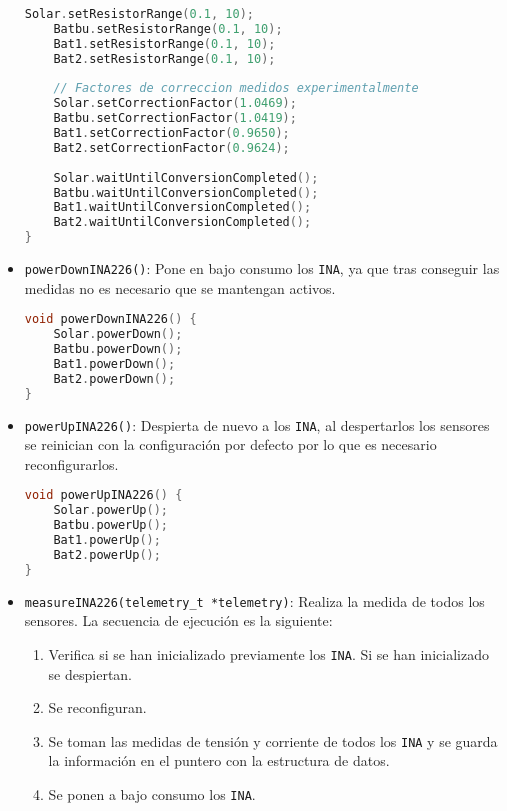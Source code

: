 \begin{itemize}
\begin{lstlisting}[captionpos=b, caption={Codigo funcion reconfig\_INAs}, language=c++]
    Solar.setResistorRange(0.1, 10);
    Batbu.setResistorRange(0.1, 10);
    Bat1.setResistorRange(0.1, 10);
    Bat2.setResistorRange(0.1, 10);
    
    // Factores de correccion medidos experimentalmente
    Solar.setCorrectionFactor(1.0469);
    Batbu.setCorrectionFactor(1.0419);
    Bat1.setCorrectionFactor(0.9650);
    Bat2.setCorrectionFactor(0.9624);
    
    Solar.waitUntilConversionCompleted();
    Batbu.waitUntilConversionCompleted();
    Bat1.waitUntilConversionCompleted();
    Bat2.waitUntilConversionCompleted();
}
\end{lstlisting}

\item \texttt{powerDownINA226()}: Pone en bajo consumo los \texttt{INA}, ya que tras conseguir las medidas no es necesario que se mantengan activos.

\begin{lstlisting}[captionpos=b, caption={Codigo funcion powerDownINA226}, language=c++]
void powerDownINA226() {
    Solar.powerDown();
    Batbu.powerDown();
    Bat1.powerDown();
    Bat2.powerDown();
}
\end{lstlisting}


\item \texttt{powerUpINA226()}: Despierta de nuevo a los \texttt{INA}, al despertarlos los sensores se reinician con la configuración por defecto por lo que es necesario reconfigurarlos.

\begin{lstlisting}[captionpos=b, caption={Codigo funcion powerUpINA226}, language=c++]
void powerUpINA226() {
    Solar.powerUp();
    Batbu.powerUp();
    Bat1.powerUp();
    Bat2.powerUp();
}
\end{lstlisting}

\item \texttt{measureINA226(telemetry\_t *telemetry)}: Realiza la medida de todos los sensores. La secuencia de ejecución es la siguiente:

\begin{enumerate}
    \item Verifica si se han inicializado previamente los \texttt{INA}. Si se han inicializado se despiertan.
    \item Se reconfiguran.
    \item Se toman las medidas de tensión y corriente de todos los \texttt{INA} y se guarda la información en el puntero con la estructura de datos.
    \item Se ponen a bajo consumo los \texttt{INA}.
\end{enumerate}


\end{itemize}
